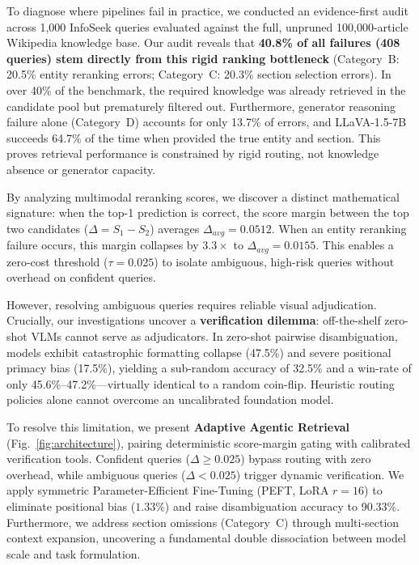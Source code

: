 \documentclass[conference]{IEEEtran}
\begin{document}
To diagnose where pipelines fail in practice, we conducted an evidence-first audit across 1,000 InfoSeek queries evaluated against the full, unpruned 100,000-article Wikipedia knowledge base. Our audit reveals that \textbf{40.8\% of all failures (408 queries) stem directly from this rigid ranking bottleneck} (Category~B: 20.5\% entity reranking errors; Category~C: 20.3\% section selection errors). In over 40\% of the benchmark, the required knowledge was already retrieved in the candidate pool but prematurely filtered out. Furthermore, generator reasoning failure alone (Category~D) accounts for only 13.7\% of errors, and LLaVA-1.5-7B succeeds 64.7\% of the time when provided the true entity and section. This proves retrieval performance is constrained by rigid routing, not knowledge absence or generator capacity.

By analyzing multimodal reranking scores, we discover a distinct mathematical signature: when the top-1 prediction is correct, the score margin between the top two candidates ($\Delta = S_1 - S_2$) averages $\Delta_{avg} = 0.0512$. When an entity reranking failure occurs, this margin collapses by $3.3\times$ to $\Delta_{avg} = 0.0155$. This enables a zero-cost threshold ($\tau = 0.025$) to isolate ambiguous, high-risk queries without overhead on confident queries.

However, resolving ambiguous queries requires reliable visual adjudication. Crucially, our investigations uncover a \textbf{verification dilemma}: off-the-shelf zero-shot VLMs cannot serve as adjudicators. In zero-shot pairwise disambiguation, models exhibit catastrophic formatting collapse (47.5\%) and severe positional primacy bias (17.5\%), yielding a sub-random accuracy of 32.5\% and a win-rate of only 45.6\%--47.2\%---virtually identical to a random coin-flip. Heuristic routing policies alone cannot overcome an uncalibrated foundation model.

To resolve this limitation, we present \textbf{Adaptive Agentic Retrieval} (Fig.~\ref{fig:architecture}), pairing deterministic score-margin gating with calibrated verification tools. Confident queries ($\Delta \ge 0.025$) bypass routing with zero overhead, while ambiguous queries ($\Delta < 0.025$) trigger dynamic verification. We apply symmetric Parameter-Efficient Fine-Tuning (PEFT, LoRA $r=16$) to eliminate positional bias ($1.33\%$) and raise disambiguation accuracy to 90.33\%. Furthermore, we address section omissions (Category~C) through multi-section context expansion, uncovering a fundamental double dissociation between model scale and task formulation.
\end{document}
